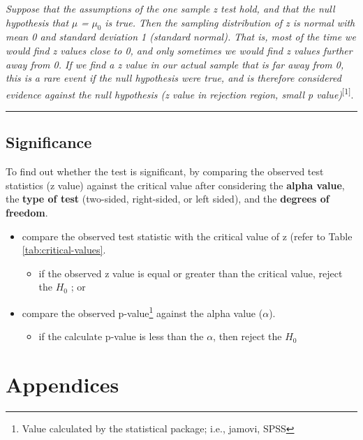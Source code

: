 \documentclass[
]{article}
\providecommand{\tightlist}{%
  \setlength{\itemsep}{0pt}\setlength{\parskip}{0pt}}
\begin{document}
\emph{Suppose that the assumptions of the one sample z test hold, and that the null hypothesis that} \(\mu\) \emph{=} \(\mu_0\) \emph{is true. Then the sampling distribution of z is normal with mean 0 and standard deviation 1 (standard normal). That is, most of the time we would find z values close to 0, and only sometimes we would find z values further away from 0. If we find a z value in our actual sample that is far away from 0, this is a rare event if the null hypothesis were true, and is therefore considered evidence against the null hypothesis (z value in rejection region, small p value)}\textsuperscript{{[}1{]}}.

\begin{center}\rule{0.5\linewidth}{0.5pt}\end{center}

\hypertarget{significance}{%
\subsection{Significance}\label{significance}}

To find out whether the test is significant, by comparing the observed test statistics (z value) against the critical value after considering the \textbf{alpha value}, the \textbf{type of test} (two-sided, right-sided, or left sided), and the \textbf{degrees of freedom}.

\begin{itemize}
\item
  compare the observed test statistic with the critical value of z (refer to Table \ref{tab:critical-values}.

  \begin{itemize}
  \tightlist
  \item
    if the observed z value is equal or greater than the critical value, reject the \(H_0\) ; or
  \end{itemize}
\item
  compare the observed p-value\footnote{Value calculated by the statistical package; i.e., jamovi, SPSS} against the alpha value (\(\alpha\)).

  \begin{itemize}
  \tightlist
  \item
    if the calculate p-value is less than the \(\alpha\), then reject the \(H_0\)
  \end{itemize}
\end{itemize}

\hypertarget{appendices}{%
\section*{Appendices}\label{appendices}}
\end{document}
